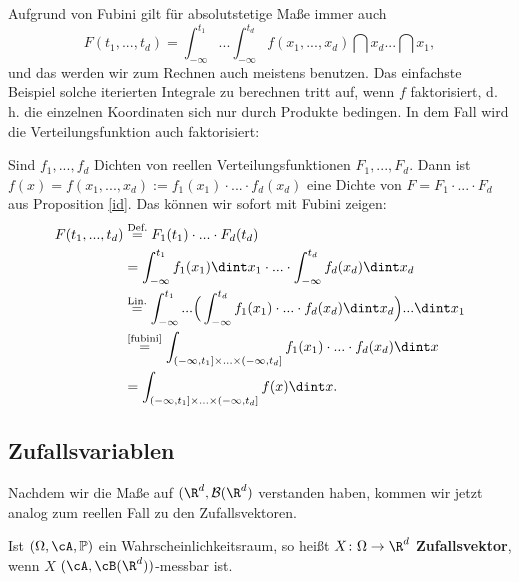 Aufgrund von Fubini gilt f\"ur absolutstetige Ma\ss e immer auch
 \[ F(t_1,...,t_d) = \int_{-\infty}^{t_1}...\int_{-\infty}^{t_d}f(x_1,...,x_d)\dint x_d... \dint x_1,\]
und das werden wir zum Rechnen auch meistens benutzen. Das einfachste Beispiel solche iterierten Integrale zu berechnen tritt auf, wenn $f$ faktorisiert, d. h. die einzelnen Koordinaten sich nur durch Produkte bedingen. In dem Fall wird die Verteilungsfunktion auch faktorisiert:
\begin{beispiel}\label{dichte}
	Sind $f_1,...,f_d$ Dichten von reellen Verteilungsfunktionen $F_1,...,F_d$. Dann ist $f(x)= f(x_1,...,x_d) := f_1(x_1)\cdot ... \cdot f_d(x_d)$ eine Dichte von $F=F_1\cdot ... \cdot F_d$ aus Proposition \ref{id}. Das k\"onnen wir sofort mit Fubini zeigen:
	\begin{align*}
		F(t_1,...,t_d) &\overset{\text{Def.}}{=} F_1(t_1)\cdot ... \cdot F_d(t_d)\\
		& = \int_{-\infty}^{t_1} f_1(x_1) \dint x_1 \cdot ... \cdot \int_{-\infty}^{t_d} f_d(x_d) \dint x_d \\
		&\overset{\text{Lin.}}{=} \int_{-\infty}^{t_1} ... \Big(\int_{-\infty}^{t_d} f_1(x_1)\cdot ... \cdot f_d(x_d) \dint x_d\Big) ... \dint x_1 \\
		&\overset{\text{\ref{fubini}}}{=} \int_{(-\infty,t_1] \times ... \times (-\infty,t_d]} f_1(x_1)\cdot ... \cdot f_d(x_d) \dint x\\
		&= \int_{(-\infty,t_1]\times ...\times (-\infty,t_d]}f(x)\dint x.
	\end{align*}
\end{beispiel}

\subsection*{Zufallsvariablen}
Nachdem wir die Ma\ss e auf $(\R^d, \mathcal B(\R^d)$ verstanden haben, kommen wir jetzt analog zum reellen Fall zu den Zufallsvektoren.
\begin{deff}
	Ist $(\Omega, \cA, \mathbb{P})$ ein Wahrscheinlichkeitsraum, so heißt $X \colon \Omega \to \R^d$ \textbf{Zufallsvektor}, wenn $X$ $(\cA, \cB(\R^d))$-messbar ist.
\end{deff}

